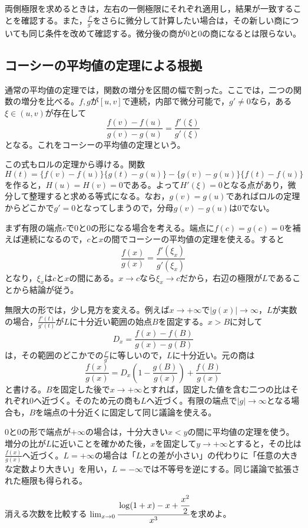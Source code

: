 両側極限を求めるときは，左右の一側極限にそれぞれ適用し，結果が一致することを確認する。また，$\frac{f'}{g'}$をさらに微分して計算したい場合は，その新しい商についても同じ条件を改めて確認する。微分後の商が$0$と$0$の商になるとは限らない。

\subsection{コーシーの平均値の定理による根拠}

通常の平均値の定理では，関数の増分を区間の幅で割った。ここでは，二つの関数の増分を比べる。$f,g$が$[u,v]$で連続，内部で微分可能で，$g'\ne0$なら，ある$\xi\in(u,v)$が存在して
\[
 \frac{f(v)-f(u)}{g(v)-g(u)}=\frac{f'(\xi)}{g'(\xi)}
\]
となる。これをコーシーの平均値の定理という。

この式もロルの定理から導ける。関数
\[
 H(t)=\{f(v)-f(u)\}\{g(t)-g(u)\}
      -\{g(v)-g(u)\}\{f(t)-f(u)\}
\]
を作ると，$H(u)=H(v)=0$である。よって$H'(\xi)=0$となる点があり，微分して整理すると求める等式になる。なお，$g(v)=g(u)$であればロルの定理からどこかで$g'=0$となってしまうので，分母$g(v)-g(u)$は$0$でない。

まず有限の端点$c$で$0$と$0$の形になる場合を考える。端点に$f(c)=g(c)=0$を補えば連続になるので，$c$と$x$の間でコーシーの平均値の定理を使える。すると
\[
 \frac{f(x)}{g(x)}=\frac{f'(\xi_x)}{g'(\xi_x)}
\]
となり，$\xi_x$は$c$と$x$の間にある。$x\to c$なら$\xi_x\to c$だから，右辺の極限が$L$であることから結論が従う。

無限大の形では，少し見方を変える。例えば$x\to+\infty$で$|g(x)|\to\infty$，$L$が実数の場合，$\frac{f'(t)}{g'(t)}$が$L$に十分近い範囲の始点$B$を固定する。$x>B$に対して
\[
 D_x=\frac{f(x)-f(B)}{g(x)-g(B)}
\]
は，その範囲のどこかでの$\frac{f'}{g'}$に等しいので，$L$に十分近い。元の商は
\[
 \frac{f(x)}{g(x)}
 =D_x\left(1-\frac{g(B)}{g(x)}\right)+\frac{f(B)}{g(x)}
\]
と書ける。$B$を固定した後で$x\to+\infty$とすれば，固定した値を含む二つの比はそれぞれ$0$へ近づく。そのため元の商も$L$へ近づく。有限の端点で$|g|\to\infty$となる場合も，$B$を端点の十分近くに固定して同じ議論を使える。

$0$と$0$の形で端点が$+\infty$の場合は，十分大きい$x<y$の間に平均値の定理を使う。増分の比が$L$に近いことを確かめた後，$x$を固定して$y\to+\infty$とすると，その比は$\frac{f(x)}{g(x)}$へ近づく。$L=+\infty$の場合は「$L$との差が小さい」の代わりに「任意の大きな定数より大きい」を用い，$L=-\infty$では不等号を逆にする。同じ議論で拡張された極限も得られる。

\begin{example}{消える次数を比較する}
$\lim_{x\to0}\cfrac{\log(1+x)-x+\cfrac{x^2}{2}}{x^3}$を求めよ。
\end{example}

